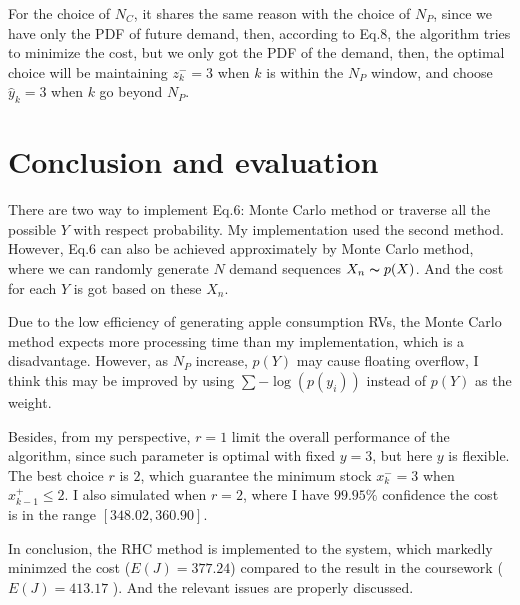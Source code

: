 \documentclass[letterpaper, 10 pt, conference]{ieeeconf}
\begin{document}
For the choice of $N_C$, it shares the same reason with the choice of $N_P$, since we have only the PDF of future demand, then, according to Eq.8, the algorithm tries to minimize the cost, but we only got the PDF of the demand, then, the optimal choice will be maintaining $z_k^- =3$ when $k$ is within the $N_P$ window, and choose $\hat{y}_k= 3$ when $k$ go beyond $N_P$.
\section{Conclusion and evaluation}
There are two way to implement Eq.6: Monte Carlo method or traverse all the possible $Y$ with respect probability. My implementation used the second method. However, Eq.6 can also be achieved approximately by Monte Carlo method, where we can randomly generate $N$ demand sequences $X_n \thicksim p(X)$. And the cost for each $Y$ is got based on these $X_n$.

Due to the low efficiency of generating apple consumption RVs, the Monte Carlo method expects more processing time than my implementation, which is a disadvantage. However, as $N_P$ increase, $p(Y)$ may cause floating overflow, I think this may be improved by using $\sum -\log(p(y_i))$ instead of $p(Y)$ as the weight.

Besides, from my perspective, $r=1$ limit the overall performance of the algorithm, since such parameter is optimal with fixed $y=3$, but here $y$ is flexible. The best choice $r$ is $2$, which guarantee the minimum stock $x_k^- = 3$ when $x_{k-1}^+ \leq 2$. I also simulated when $r=2$, where I have $99.95\%$ confidence the cost is in the range $[348.02, 360.90]$.

In conclusion, the RHC method is implemented to the system, which markedly minimzed the cost ($E(J) = 377.24$) compared to the result in the coursework \uppercase\expandafter{} ($E(J) = 413.17$ ). And the relevant issues are properly discussed.
\addtolength{\textheight}{-12cm}
%
%
\end{document}
